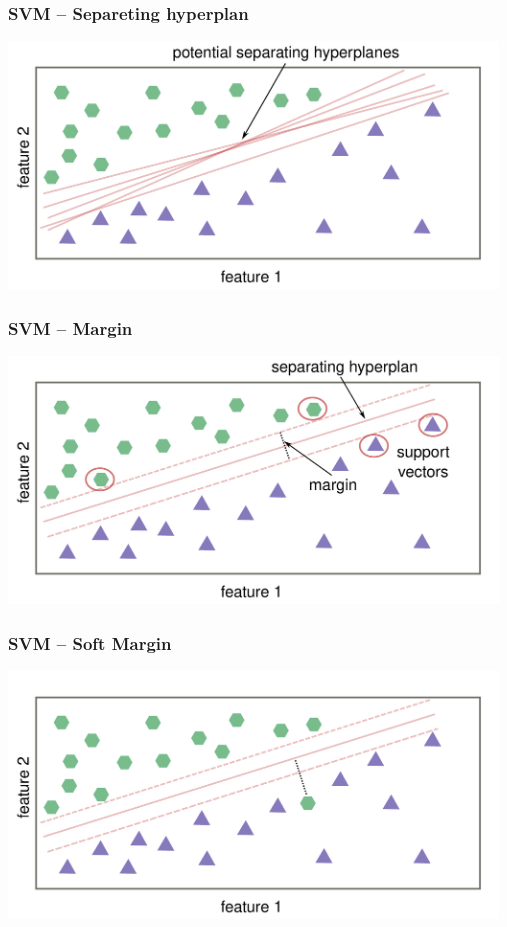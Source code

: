 \documentclass[aspectratio=169]{beamer}
\begin{document}
\begin{frame}
  \frametitle{SVM -- Separeting hyperplan}
  \begin{center}
    \includegraphics[width=13.0cm]{images/svm_potential_separating_hyperplanes.pdf}
  \end{center}
\end{frame}

\begin{frame}
  \frametitle{SVM -- Margin}
  \begin{center}
    \includegraphics[width=13.0cm]{images/svm_with_margin.pdf}
  \end{center}
\end{frame}

\begin{frame}
  \frametitle{SVM -- Soft Margin}
  \begin{center}
    \includegraphics[width=13.0cm]{images/svm_with_soft_margin.pdf}
  \end{center}
\end{frame}
\end{document}

